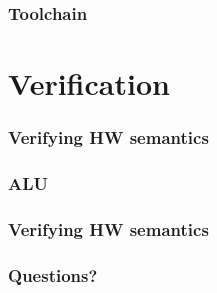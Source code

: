 \documentclass{beamer}
\begin{document}
\begin{frame}
	\frametitle{Toolchain}
\end{frame}

\section{Verification}
\begin{frame}
	\frametitle{Verifying HW semantics}
\end{frame}

\begin{frame}
	\frametitle{ALU}
\end{frame}

\begin{frame}
	\frametitle{Verifying HW semantics}
\end{frame}

\begin{frame}[fragile]
	\frametitle{Questions?}
\end{frame}

\newpage


\end{document}

